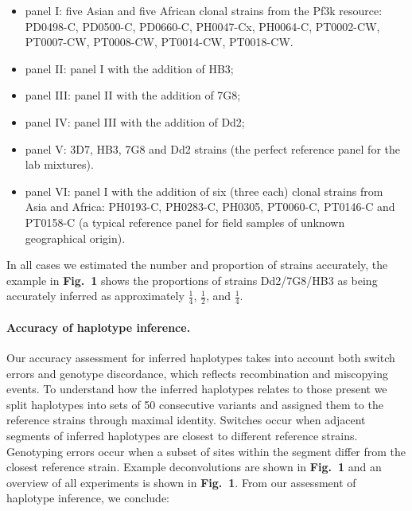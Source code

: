 \documentclass{nature}
\begin{document}
\begin{itemize}

\item panel I: five Asian and five African clonal strains from the Pf3k resource: {\textmd PD0498-C}, {\textmd PD0500-C}, {\textmd PD0660-C}, {\textmd PH0047-Cx}, {\textmd PH0064-C}, {\textmd PT0002-CW}, {\textmd PT0007-CW}, {\textmd PT0008-CW}, {\textmd PT0014-CW}, {\textmd PT0018-CW}.

\item panel II: panel I with the addition of HB3;

\item panel III: panel II with the addition of 7G8;

\item panel IV: panel III with the addition of Dd2;

\item panel V: 3D7, HB3, 7G8 and Dd2 strains (the perfect reference panel for the lab mixtures).

\item panel VI: panel I with the addition of six (three each) clonal strains from Asia and Africa: {\textmd PH0193-C}, {\textmd PH0283-C}, {\textmd PH0305}, {\textmd PT0060-C}, {\textmd PT0146-C} and {\textmd PT0158-C} (a typical reference panel for field samples of unknown geographical origin).

\end{itemize}


\noindent In all cases we estimated the number and proportion of strains accurately, the example in {\bf Fig.~1} shows the proportions of strains Dd2/7G8/HB3 as being accurately inferred as approximately $\frac{1}{4}$, $\frac{1}{2}$, and $\frac{1}{4}$.



\paragraph{Accuracy of haplotype inference.}
Our accuracy assessment for inferred haplotypes takes into account both switch errors and genotype discordance, which reflects recombination and miscopying events. To understand how the inferred haplotypes relates to those present we split haplotypes into sets of 50 consecutive variants and assigned them to the reference strains through maximal identity.  Switches occur when adjacent segments of inferred haplotypes are closest to different reference strains.  Genotyping errors occur when a subset of sites within the segment differ from the closest reference strain.  Example deconvolutions are shown in {\bf Fig.~1} and an overview of all experiments is shown in {\bf Fig.~1}. From our assessment of haplotype inference, we conclude:
\end{document}
